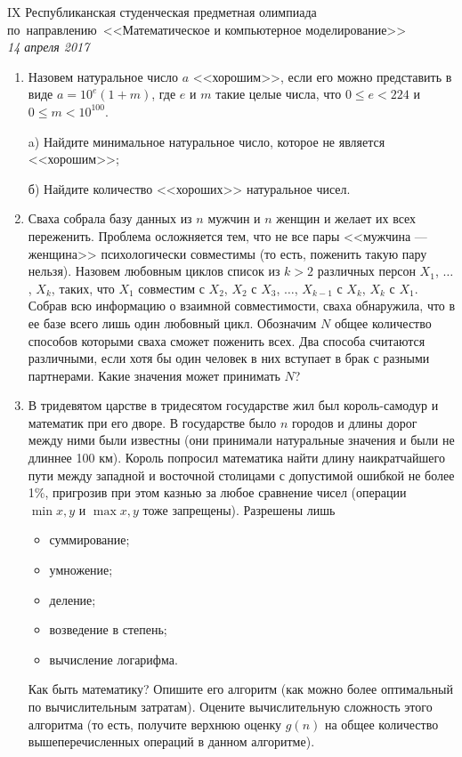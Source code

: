 \documentclass[11pt, a4paper]{article}
\newcommand{\head}[4]
{
	\pagestyle{fancy}
	\fancyhf{}
	\chead{#3, #4}

	\begin{center}
	\begin{large}
	#1 \\
	\textit{#2}\\
	\end{large}
	\end{center}

}
\begin{document}
\head{IX Республиканская студенческая предметная олимпиада по~направлению~<<Математическое и компьютерное моделирование>>}{14 апреля 2017}{Назарбаев Университет}{г.~Астана}

\begin{enumerate}
\item Назовем натуральное число $a$ <<хорошим>>, если его можно представить в виде $a = 10^e (1+m)$, где $e$ и $m$ такие целые числа, что $0 \leqslant e < 224$ и $0 \leqslant m < 10^{100}$.

a) Найдите минимальное натуральное число, которое не является <<хорошим>>;

б) Найдите количество <<хороших>> натуральное чисел.

\item Сваха собрала базу данных из $n$ мужчин и $n$ женщин и желает их всех
переженить. Проблема осложняется тем, что не все пары <<мужчина --- женщина>> психологически совместимы (то есть, поженить такую пару нельзя). Назовем любовным циклов список из $k > 2$ различных персон $X_1$, $\dots$, $X_k$, таких, что $X_1$ совместим с $X_2$, $X_2$ с $X_3$, $\dots$, $X_{k-1}$ с $X_k$, $X_k$ с $X_1$. Собрав всю информацию о взаимной совместимости, сваха обнаружила, что в ее базе всего лишь один любовный цикл. Обозначим $N$ общее количество способов которыми сваха сможет поженить всех. Два способа считаются различными, если хотя бы один человек в них вступает в брак с разными партнерами. Какие значения может принимать $N$?

\item В тридевятом царстве в тридесятом государстве жил был король-самодур и математик при его дворе. В государстве было $n$ городов и длины дорог между ними были известны (они принимали натуральные значения и были не длиннее 100 км). Король попросил математика найти длину наикратчайшего пути между западной и восточной столицами с допустимой ошибкой не более 1\%, пригрозив при этом казнью за любое сравнение чисел (операции $\min{x, y}$ и $\max{x, y}$ тоже запрещены). Разрешены лишь 
\begin{itemize}
\item суммирование;
\item умножение;
\item деление;
\item возведение в степень;
\item вычисление логарифма.
\end{itemize}
Как быть математику? Опишите его алгоритм (как можно более оптимальный по вычислительным затратам). Оцените вычислительную сложность этого алгоритма (то есть, получите верхнюю оценку $g(n)$ на общее количество вышеперечисленных операций в данном алгоритме).


\end{enumerate}
\end{document}
